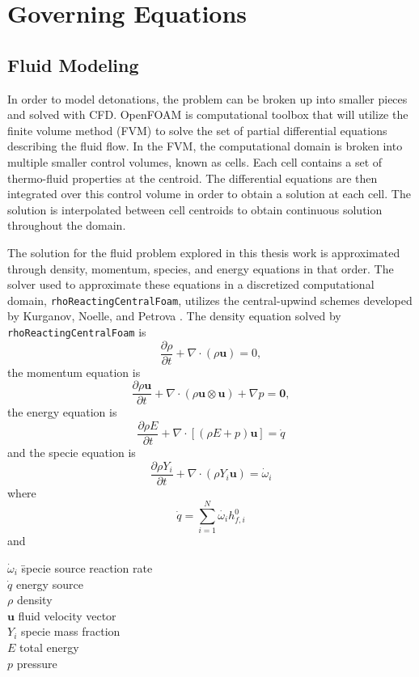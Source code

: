 \chapter{Governing Equations}
\label{math}

\section{Fluid Modeling}
In order to model detonations, the problem can be broken up into smaller pieces and solved with CFD. OpenFOAM is computational toolbox that will utilize the finite volume method (FVM) to solve the set of partial differential equations describing the fluid flow. In the FVM, the computational domain is broken into multiple smaller control volumes, known as cells. Each cell contains a set of thermo-fluid properties at the centroid. The differential equations are then integrated over this control volume in order to obtain a solution at each cell. The solution is interpolated between cell centroids to obtain continuous solution throughout the domain. 

The solution for the fluid problem explored in this thesis work is approximated through density, momentum, species, and energy equations in that order. The solver used to approximate these equations in a discretized computational domain, \verb|rhoReactingCentralFoam|, utilizes the central-upwind schemes developed by Kurganov, Noelle, and Petrova \cite{kurganov}. The density equation solved by \verb|rhoReactingCentralFoam| is
\begin{equation}
\frac{\partial \rho}{\partial t} + \nabla \cdot \left(\rho \bm{u}\right) = 0,
\end{equation}
the momentum equation is
\begin{equation}
\frac{\partial \rho\bm{u}}{\partial t} + \nabla \cdot \left(\rho \bm{u}\otimes \bm{u}\right) + \nabla p = \bm{0}, 
\end{equation}
the energy equation is
\begin{equation}
\frac{\partial \rho E}{\partial t} + \nabla \cdot \left[\left(\rho E + p\right)\bm{u}\right] = \dot{q}
\end{equation}
and the specie equation is
\begin{equation}
\frac{\partial \rho Y_i}{\partial t} + \nabla \cdot \left(\rho Y_i \bm{u}\right) = \dot{\omega}_i
\end{equation}
where 
\begin{equation}
\dot{q} = \sum_{i = 1}^N \dot{\omega_i} h_{f,i}^0
\end{equation}
and
\begin{tabbing}
\qquad \= \(\dot{\omega}_i\) \qquad \= specie source reaction rate \\ 
\> \(\dot{q}\) \> energy source \\
\> \(\rho\) \> density \\
\> \(\bm{u}\) \> fluid velocity vector \\
\> \(Y_i\) \> specie mass fraction \\
\> \(E\) \> total energy \\
\> \(p\) \> pressure
\end{tabbing}




